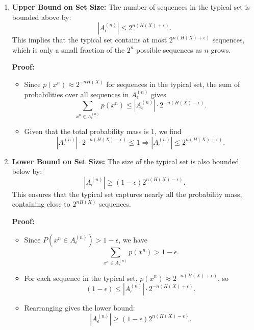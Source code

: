 \begin{enumerate}
    \item \textbf{Upper Bound on Set Size:} The number of sequences in the typical set is bounded above by:
          \[
              |A^{(n)}_\epsilon| \leq 2^{n(H(X) + \epsilon)}.
          \]
          This implies that the typical set contains at most $2^{n(H(X) + \epsilon)}$ sequences, which is only a small fraction of the $2^n$ possible sequences as $n$ grows.

          \textbf{Proof:}
          \begin{itemize}
              \item Since $p(x^n) \approx 2^{-nH(X)}$ for sequences in the typical set, the sum of probabilities over all sequences in $A^{(n)}_\epsilon$ gives
                    \[
                        \sum_{x^n \in A^{(n)}_\epsilon} p(x^n) \leq |A^{(n)}_\epsilon| \cdot 2^{-n(H(X) - \epsilon)}.
                    \]
              \item Given that the total probability mass is 1, we find
                    \[
                        |A^{(n)}_\epsilon| \cdot 2^{-n(H(X) - \epsilon)} \leq 1 \Rightarrow |A^{(n)}_\epsilon| \leq 2^{n(H(X) + \epsilon)}.
                    \]
          \end{itemize}

    \item \textbf{Lower Bound on Set Size:} The size of the typical set is also bounded below by:
          \[
              |A^{(n)}_\epsilon| \geq (1 - \epsilon) 2^{n(H(X) - \epsilon)}.
          \]
          This ensures that the typical set captures nearly all the probability mass, containing close to $2^{nH(X)}$ sequences.

          \textbf{Proof:}
          \begin{itemize}
              \item Since $P(x^n \in A^{(n)}_\epsilon) > 1 - \epsilon$, we have
                    \[
                        \sum_{x^n \in A^{(n)}_\epsilon} p(x^n) > 1 - \epsilon.
                    \]
              \item For each sequence in the typical set, $p(x^n) \approx 2^{-n(H(X) + \epsilon)}$, so
                    \[
                        (1 - \epsilon) \leq |A^{(n)}_\epsilon| \cdot 2^{-n(H(X) + \epsilon)}.
                    \]
              \item Rearranging gives the lower bound:
                    \[
                        |A^{(n)}_\epsilon| \geq (1 - \epsilon) 2^{n(H(X) - \epsilon)}.
                    \]
          \end{itemize}
\end{enumerate}




